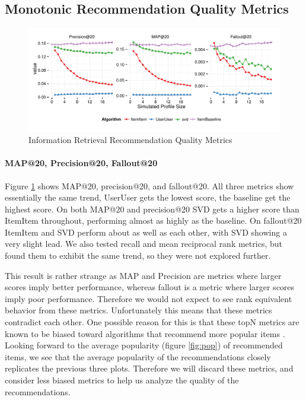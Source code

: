 \documentclass[letterpaper]{sig-alternate}
\begin{document}


\subsection*{Monotonic Recommendation Quality Metrics}

\begin{figure}[ht!]
  \centering
  \includegraphics[width=\linewidth]{../lenskit/output/ekstrandTuned20/TopNPrecision.pdf}
  \caption{Information Retrieval Recommendation Quality Metrics}
  \label{fig:map}
\end{figure}
\paragraph{MAP@20, Precision@20, Fallout@20}
  Figure \ref{fig:map} shows MAP@20, precision@20, and fallout@20.
  All three metrics show essentially the same trend, UserUser gets the lowest score, the baseline get the highest score.
  On both MAP@20 and precision@20 SVD gets a higher score than ItemItem throughout, performing almost as highly as the baseline.
  On fallout@20 ItemItem and SVD perform about as well as each other, with SVD showing a very slight lead.
  We also tested recall and mean reciprocal rank metrics, but found them to exhibit the same trend, so they were not explored further.

  This result is rather strange as MAP and Precision are metrics where larger scores imply better performance, whereas fallout is a metric where larger scores imply poor performance.
  Therefore we would not expect to see rank equivalent behavior from these metrics.
  Unfortunately this means that these metrics contradict each other.
  One possible reason for this is that these topN metrics are known to be biased toward algorithms that recommend more popular items \cite{bellogin}.
  Looking forward to the average popularity (figure \ref{fig:pop}) of recommended items, we see that the average popularity of the recommendations closely replicates the previous three plots.
  Therefore we will discard these metrics, and consider less biased metrics to help us analyze the quality of the recommendations.
\end{document}
